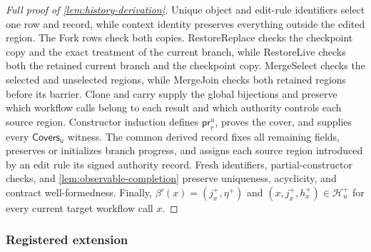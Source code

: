 \begin{proof}[Full proof of \cref{lem:history-derivation}]
Unique object and edit-rule identifiers select one row and record, while context identity preserves everything outside the edited region.
The Fork rows check both copies.
RestoreReplace checks the checkpoint copy and the exact treatment of the current branch, while RestoreLive checks both the retained current branch and the checkpoint copy.
MergeSelect checks the selected and unselected regions, while MergeJoin checks both retained regions before its barrier.
Clone and carry supply the global bijections and preserve which workflow calls belong to each result and which authority controls each source region.
Constructor induction defines \(\mathsf{pr}^u_r\), proves the cover, and supplies every \(\mathsf{Covers}_u\) witness.
The common derived record fixes all remaining fields, preserves or initializes branch progress, and assigns each source region introduced by an edit rule its signed authority record.
Fresh identifiers, partial-constructor checks, and \cref{lem:observable-completion} preserve uniqueness, acyclicity, and contract well-formedness.
Finally, \(\beta'(x)=(j_x^+,\eta^+)\) and \((x,j_x^+,h_x^+)\in\mathcal H_u^+\) for every current target workflow call \(x\).
\end{proof}

\subsubsection{Registered extension}
\label{app:registered-extension}

